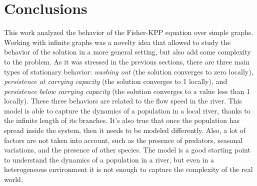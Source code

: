 \section{Conclusions}

This work analyzed the behavior of the Fisher-KPP equation over simple graphs. Working with infinite graphs was a novelty idea that allowed to study the behavior of the solution in a more general setting, but also add some complexity to the problem. As it was stressed in the previous sections, there are three main types of stationary behavior: \textit{washing out} (the solution converges to zero locally), \textit{persistence at carrying capacity} (the solution converges to 1 locally), and \textit{persistence below carrying capacity} (the solution converges to a value less than 1 locally). These three behaviors are related to the flow speed in the river. This model is able to capture the dynamics of a population in a local river, thanks to the infinite length of its branches. It's also true that once the population has spread inside the system, then it needs to be modeled differently. Also, a lot of factors are not taken into account, such as the presence of predators, seasonal variations, and the presence of other species. The model is a good starting point to understand the dynamics of a population in a river, but even in a heterogeneous environment it is not enough to capture the complexity of the real world.